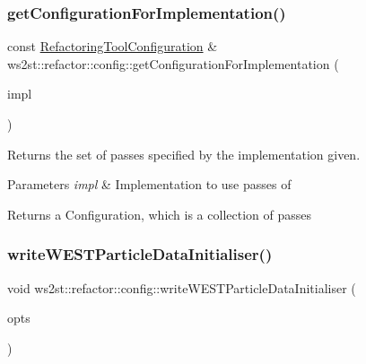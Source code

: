 \subsubsection{\texorpdfstring{get\+Configuration\+For\+Implementation()}{getConfigurationForImplementation()}}
{\footnotesize\ttfamily const \mbox{\hyperlink{classws2st_1_1refactor_1_1RefactoringToolConfiguration}{Refactoring\+Tool\+Configuration}} \& ws2st\+::refactor\+::config\+::get\+Configuration\+For\+Implementation (\begin{DoxyParamCaption}\item[{\mbox{\hyperlink{common_8hpp_aad9d1428f17c06ff77ef15dea22624dc}{Implementations}}}]{impl }\end{DoxyParamCaption})}



Returns the set of passes specified by the implementation given. 


\begin{DoxyParams}{Parameters}
{\em impl} & Implementation to use passes of \\
\hline
\end{DoxyParams}
\begin{DoxyReturn}{Returns}
a Configuration, which is a collection of passes 
\end{DoxyReturn}
\mbox{\label{namespacews2st_1_1refactor_1_1config_afe16d771b484da1d613e8441ff31b634}} 
\subsubsection{\texorpdfstring{write\+W\+E\+S\+T\+Particle\+Data\+Initialiser()}{writeWESTParticleDataInitialiser()}}
{\footnotesize\ttfamily void ws2st\+::refactor\+::config\+::write\+W\+E\+S\+T\+Particle\+Data\+Initialiser (\begin{DoxyParamCaption}\item[{const \mbox{\hyperlink{structWashOptions}{Wash\+Options}} \&}]{opts }\end{DoxyParamCaption})}

\mbox{\label{namespacews2st_1_1refactor_1_1config_a315ab1f03952a8b64749290fd76378d6}} 
